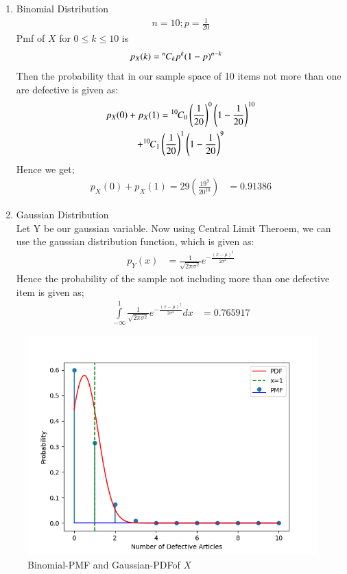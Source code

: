 \documentclass[journal,12pt,twocolumn]{IEEEtran}
\theoremstyle{remark}
\begin{document}
\begin{enumerate}
    \item Binomial Distribution
\begin{align}
n=10 ; p=\frac{1}{20}
\end{align}
Pmf of $X$ for $0 \leq k \leq 10$ is
\begin{align}
p_X(k)&={{}^{n}\mkern-1muC_{k}}p^k(1-p)^{n-k}
\end{align}
Then the probability that in our sample space of 10 items not more than one are defective is given as:
\begin{multline}
p_X(0)+p_X(1)={{}^{10}\mkern-1muC_{0}}\left(\frac{1}{20}\right)^0\left(1-\frac{1}{20}\right)^{10}\\
+{{}^{10}\mkern-1muC_{1}}\left(\frac{1}{20}\right)^1\left(1-\frac{1}{20}\right)^{9}
\end{multline}
Hence we get;
\begin{align}
p_X(0)+p_X(1)=29\left(\frac{19^9}{20^{10}}\right)
            &=0.91386
\end{align}
\item Gaussian Distribution\\
Let Y be our gaussian variable. Now using Central Limit Theroem, we can use the gaussian
distribution function, which is given as:
\begin{align}
p_Y(x)&=\frac{1}{\sqrt{2\pi\sigma^2}}e^{-\frac{(x-\mu)^2}{2\sigma^2}}
\end{align}
Hence the probability of the sample not including more than one defective item is given as;
\begin{align}
    \int\limits_{-\infty}^1 \frac{1}{\sqrt{2\pi\sigma^2}}e^{-\frac{(x-\mu)^2}{2\sigma^2}}dx
    &= 0.765917
\end{align}
\end{enumerate}
\begin{figure}[ht]
    \centering
    \includegraphics[width=\columnwidth]{./figs/figure1.png}
    \caption{ Binomial-PMF and Gaussian-PDFof $X$}
\end{figure}
\end{document}
